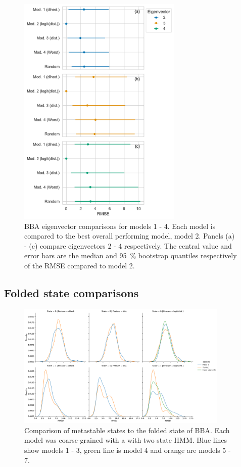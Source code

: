 \documentclass{article}
\begin{document}
\begin{figure}[h]
    \centering
    \includegraphics[width=0.7\textwidth]{figures/ev_comparisons/1fme.pdf}
    \caption{BBA eigenvector comparisons for models 1 - 4.  Each model is compared to the best overall performing model, model 2.  Panels (a) - (c) compare eigenvectors 2 - 4 respectively. The central value and error bars are the median and \SI{95}{\percent} bootstrap quantiles respectively of the RMSE compared to model 2. }
    \label{fig:bba_m1_ev_comparisons}
\end{figure}

\clearpage
\subsection{Folded state comparisons}
\begin{figure}[h]
    \centering
    \includegraphics[width=0.9\textwidth]{figures/hmm_folded_state/BBA.pdf}
    \caption{Comparison of metastable states to the folded state of BBA. Each model was coarse-grained with a with two state HMM. Blue lines show models 1 - 3, green line is model 4 and orange are models 5 - 7.}
    \label{fig:bba_folded_comparisons}
\end{figure}
\end{document}
